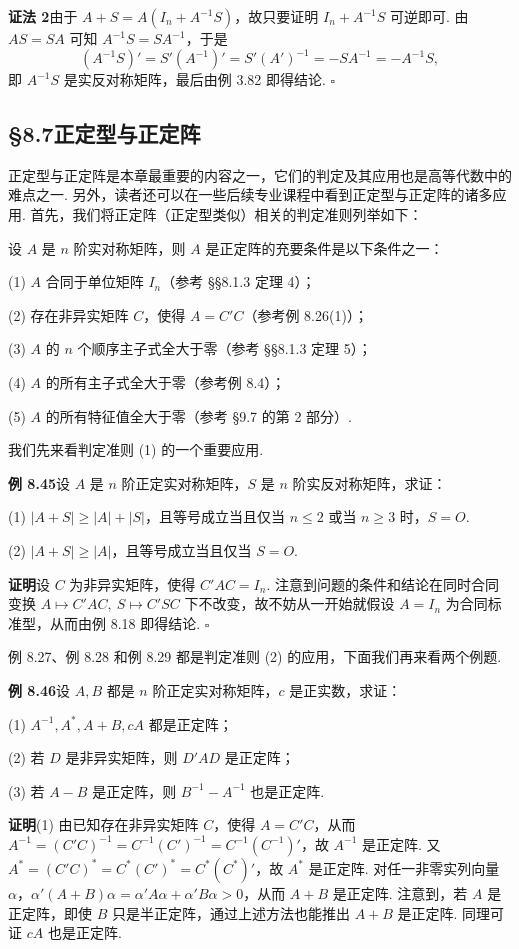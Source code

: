 \documentclass[UTF8,12pt,a4paper,fontset=fandol]{ctexart}
\begin{document}
\noindent\textbf{证法 2}\quad 由于 $A+S=A(I_n+A^{-1}S)$，故只要证明 $I_n+A^{-1}S$ 可逆即可. 由 $AS=SA$ 可知 $A^{-1}S=SA^{-1}$，于是
\[
(A^{-1}S)'=S'(A^{-1})'=S'(A')^{-1}=-SA^{-1}=-A^{-1}S,
\]
即 $A^{-1}S$ 是实反对称矩阵，最后由例 3.82 即得结论. $\ensuremath{\square}$

\subsection*{§8.7\quad 正定型与正定阵}

正定型与正定阵是本章最重要的内容之一，它们的判定及其应用也是高等代数中的难点之一. 另外，读者还可以在一些后续专业课程中看到正定型与正定阵的诸多应用. 首先，我们将正定阵（正定型类似）相关的判定准则列举如下：

设 $A$ 是 $n$ 阶实对称矩阵，则 $A$ 是正定阵的充要条件是以下条件之一：

(1) $A$ 合同于单位矩阵 $I_n$（参考 §§8.1.3 定理 4）；

(2) 存在非异实矩阵 $C$，使得 $A=C'C$（参考例 8.26(1)）；

(3) $A$ 的 $n$ 个顺序主子式全大于零（参考 §§8.1.3 定理 5）；

(4) $A$ 的所有主子式全大于零（参考例 8.4）；

(5) $A$ 的所有特征值全大于零（参考 §9.7 的第 2 部分）.

我们先来看判定准则 (1) 的一个重要应用.

\noindent\textbf{例 8.45}\quad 设 $A$ 是 $n$ 阶正定实对称矩阵，$S$ 是 $n$ 阶实反对称矩阵，求证：

(1) $|A+S|\ge |A|+|S|$，且等号成立当且仅当 $n\le 2$ 或当 $n\ge 3$ 时，$S=O$.

(2) $|A+S|\ge |A|$，且等号成立当且仅当 $S=O$.

\noindent\textbf{证明}\quad 设 $C$ 为非异实矩阵，使得 $C'AC=I_n$. 注意到问题的条件和结论在同时合同变换 $A\mapsto C'AC,\ S\mapsto C'SC$ 下不改变，故不妨从一开始就假设 $A=I_n$ 为合同标准型，从而由例 8.18 即得结论. $\ensuremath{\square}$

例 8.27、例 8.28 和例 8.29 都是判定准则 (2) 的应用，下面我们再来看两个例题.

\noindent\textbf{例 8.46}\quad 设 $A,B$ 都是 $n$ 阶正定实对称矩阵，$c$ 是正实数，求证：

(1) $A^{-1},A^*,A+B,cA$ 都是正定阵；

(2) 若 $D$ 是非异实矩阵，则 $D'AD$ 是正定阵；

(3) 若 $A-B$ 是正定阵，则 $B^{-1}-A^{-1}$ 也是正定阵.

\noindent\textbf{证明}\quad (1) 由已知存在非异实矩阵 $C$，使得 $A=C'C$，从而 $A^{-1}=(C'C)^{-1}=C^{-1}(C')^{-1}=C^{-1}(C^{-1})'$，故 $A^{-1}$ 是正定阵. 又 $A^*=(C'C)^*=C^*(C')^*=C^*(C^*)'$，故 $A^*$ 是正定阵. 对任一非零实列向量 $\alpha$，$\alpha'(A+B)\alpha=\alpha'A\alpha+\alpha'B\alpha>0$，从而 $A+B$ 是正定阵. 注意到，若 $A$ 是正定阵，即使 $B$ 只是半正定阵，通过上述方法也能推出 $A+B$ 是正定阵. 同理可证 $cA$ 也是正定阵.
\end{document}
